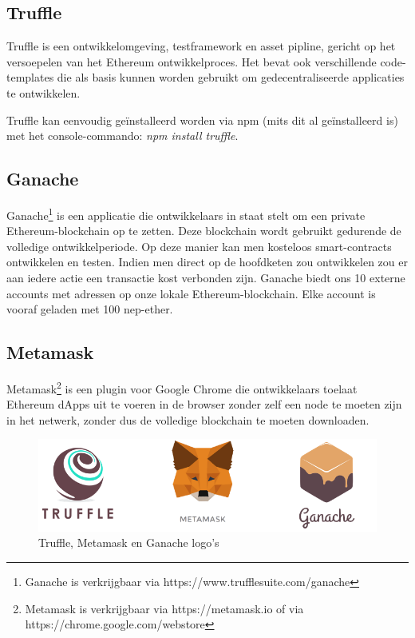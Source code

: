 \subsection{Truffle}
Truffle is een ontwikkelomgeving, testframework en asset pipline, gericht op het versoepelen van het Ethereum ontwikkelproces. Het bevat ook verschillende code-templates die als basis kunnen worden gebruikt om gedecentraliseerde applicaties te ontwikkelen.

Truffle kan eenvoudig geïnstalleerd worden via npm (mits dit al geïnstalleerd is) met het console-commando: \textit{npm install truffle}.

\subsection{Ganache}
Ganache\footnote{Ganache is verkrijgbaar via https://www.trufflesuite.com/ganache} is een applicatie die ontwikkelaars in staat stelt om een private Ethereum-blockchain op te zetten. Deze blockchain wordt gebruikt gedurende de volledige ontwikkelperiode. Op deze manier kan men kosteloos smart-contracts ontwikkelen en testen. Indien men direct op de hoofdketen zou ontwikkelen zou er aan iedere actie een transactie kost verbonden zijn. Ganache biedt ons 10 externe accounts met adressen op onze lokale Ethereum-blockchain. Elke account is vooraf geladen met 100 nep-ether.

\subsection{Metamask}
Metamask\footnote{Metamask is verkrijgbaar via https://metamask.io of via https://chrome.google.com/webstore} is een plugin voor Google Chrome die ontwikkelaars toelaat Ethereum dApps uit te voeren in de browser zonder zelf een node te moeten zijn in het netwerk, zonder dus de volledige blockchain te moeten downloaden.

\begin{figure}
	\includegraphics[width=\linewidth]{img/metamask-truffle-ganache.png}
	\caption{Truffle, Metamask en Ganache logo's}
	\label{fig:metamask-truffle-ganache}
\end{figure}









